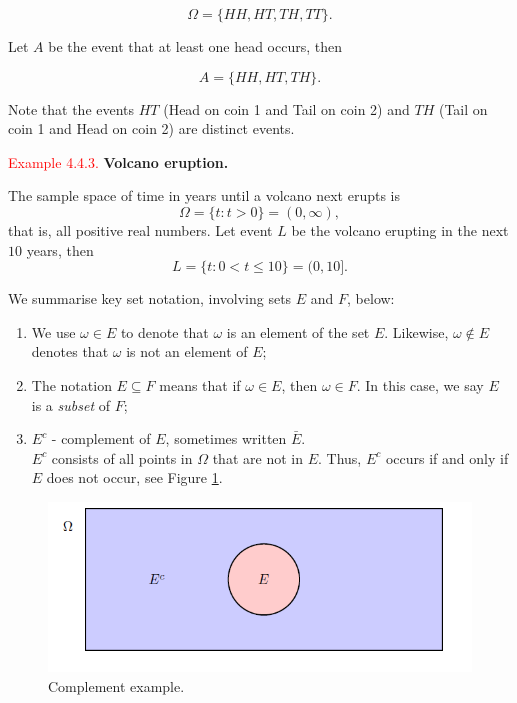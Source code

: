 \documentclass[
]{book}
\providecommand{\tightlist}{%
  \setlength{\itemsep}{0pt}\setlength{\parskip}{0pt}}
\begin{document}
\[\Omega = \{ HH, HT, TH, TT \}.\]

Let \(A\) be the event that at least one head occurs, then

\[A = \{ HH, HT, TH \}.\]

Note that the events \(HT\) (Head on coin 1 and Tail on coin 2) and \(TH\) (Tail on coin 1 and Head on coin 2) are distinct events.

\hfill\break

\leavevmode{}%
\textcolor{red}{Example 4.4.3.}
{\textbf{Volcano eruption.}}

The sample space of time in years until a volcano next erupts is
\[ \Omega = \{t: t >0 \} =(0,\infty),\]
that is, all positive real numbers. Let event \(L\) be the volcano erupting in the next \(10\) years, then
\[L = \{t: 0 < t \leq 10\} =(0,10].\]

We summarise key set notation, involving sets \(E\) and \(F\), below:

\begin{enumerate}
\def\labelenumi{\arabic{enumi}.}
\tightlist
\item
  We use \(\omega \in E\) to denote that \(\omega\) is an element of the set \(E\). Likewise, \(\omega \notin E\) denotes that \(\omega\) is not an element of \(E\);\\
\item
  The notation \(E \subseteq F\) means that if \(\omega \in E\), then \(\omega \in F\). In this case, we say \(E\) is a \emph{subset} of \(F\);\\
\item
  \(E^{c}\) - complement of \(E\), sometimes written \(\bar{E}\).\\
  \(E^{c}\) consists of all points in \(\Omega\) that are not in \(E\). Thus, \(E^{c}\) occurs
  if and only if \(E\) does not occur, see Figure \ref{fig:Set1}.
\end{enumerate}

\begin{figure}
\includegraphics[width=0.8\linewidth]{Images/Set1} \caption{ Complement example.}\label{fig:Set1}
\end{figure}
\end{document}
